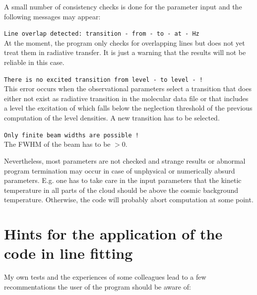 A small number of consistency checks is done for the parameter input
and the following messages may appear:

\begin{description}
\item{}{\tt Line overlap detected: transition - from - to - at - Hz}\\
At the moment, the program only checks for overlapping lines
but does not yet treat them in radiative transfer. It is just a warning
that the results will not be reliable in this case.

\item{}{\tt There is no excited transition from level - to level - !}\\
This error occurs when the observational parameters select a transition
that does either not exist as radiative transition in the molecular 
data file or that includes a level
the excitation of which falls below the neglection threshold of
the previous computation of the level densities.
A new transition has to be selected.

\item{}{\tt Only finite beam widths are possible !}\\ The FWHM of the beam 
has to be $>0$.
\end{description}

Nevertheless, most parameters are not checked and strange results
or abnormal program termination may occur in case of unphysical
or numerically absurd parameters. E.g. one has to take care in the
input parameters that the kinetic temperature in all parts of the cloud
should be above the cosmic background temperature. Otherwise, the
code will probably abort computation at some point.

\section{Hints for the application of the code in line fitting}

My own tests and the experiences of some colleagues lead to a few recommentations the user of the program should be aware of:

